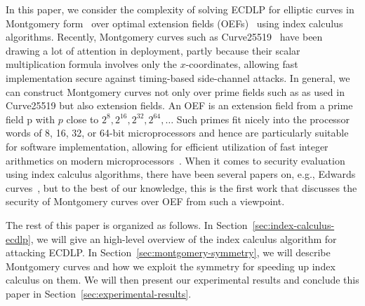 In this paper, we consider the complexity of solving ECDLP for
elliptic curves in Montgomery form~\cite{1987-montgomery} over optimal
extension fields (OEFs)~\cite{DBLP:conf/crypto/BaileyP98} using index
calculus algorithms.
%
Recently, Montgomery curves such as
Curve25519~\cite{DBLP:conf/pkc/Bernstein06} have been drawing a lot of
attention in deployment, partly because their scalar multiplication
formula involves only the $x$-coordinates, allowing fast
implementation secure against timing-based side-channel attacks.
%
In general, we can construct Montgomery curves not only over prime
fields such as  as used in Curve25519 but also extension
fields.
%
An OEF is an extension field from a prime field \F p with $p$ close to
$2^8, 2^{16}, 2^{32}, 2^{64}, \ldots$
%
Such primes fit nicely into the processor words of 8, 16, 32, or
64-bit microprocessors and hence are particularly suitable for
software implementation, allowing for efficient utilization of fast
integer arithmetics on modern
microprocessors~\cite{DBLP:conf/crypto/BaileyP98}.
%
When it comes to security evaluation using index calculus algorithms,
there have been several papers on, e.g., Edwards
curves~\cite{DBLP:journals/joc/FaugereGHR14,DBLP:conf/indocrypt/GalbraithG14},
but to the best of our knowledge, this is the first work that
discusses the security of Montgomery curves over OEF from such a
viewpoint.

The rest of this paper is organized as follows.
%
In Section~\ref{sec:index-calculus-ecdlp}, we will give an high-level
overview of the index calculus algorithm for attacking ECDLP.
%
In Section~\ref{sec:montgomery-symmetry}, we will describe Montgomery
curves and how we exploit the symmetry for speeding up index calculus
on them.
%
We will then present our experimental results and conclude this paper
in Section~\ref{sec:experimental-results}.
